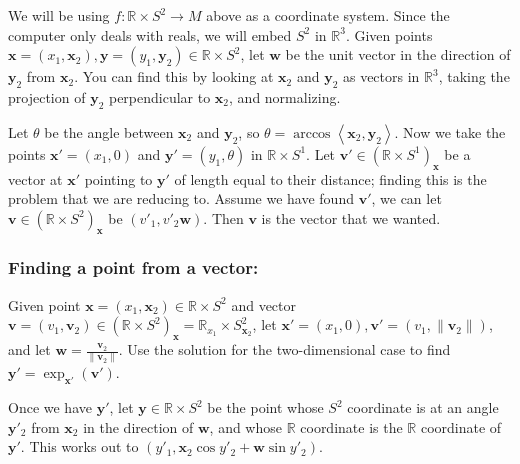\bigskip

We will be using $f:\mathbb{R} \times S^2 \to M$ above as a coordinate system. Since the computer only deals with reals, we will embed $S^2$ in $\mathbb{R}^3$. Given points $\textbf{x} = (x_1, \textbf{x}_2), \textbf{y} = (y_1, \textbf{y}_2) \in \mathbb{R} \times S^2$, let $\textbf{w}$ be the unit vector in the direction of $\textbf{y}_2$ from $\textbf{x}_2$. You can find this by looking at $\textbf{x}_2$ and $\textbf{y}_2$ as vectors in $\mathbb{R}^3$, taking the projection of $\textbf{y}_2$ perpendicular to $\textbf{x}_2$, and normalizing.

Let $\theta$ be the angle between $\textbf{x}_2$ and $\textbf{y}_2$, so $\theta = \arccos\left<\textbf{x}_2,\textbf{y}_2\right>$. Now we take the points $\textbf{x}' = (x_1, 0)$ and $\textbf{y}' = (y_1, \theta)$ in $\mathbb{R} \times S^1$. Let $\textbf{v}' \in (\mathbb{R} \times S^1)_\textbf{x}$ be a vector at $\textbf{x}'$ pointing to $\textbf{y}'$ of length equal to their distance; finding this is the problem that we are reducing to. Assume we have found $\textbf{v}'$, we can let $\textbf{v} \in (\mathbb{R} \times S^2)_\textbf{x}$ be $(v'_1, v'_2\textbf{w})$. Then $\textbf{v}$ is the vector that we wanted.



\bigskip

\subsubsection{Finding a point from a vector:}

\bigskip

Given point $\textbf{x} = (x_1, \textbf{x}_2) \in \mathbb{R} \times S^2$ and vector $\textbf{v} = (v_1, \textbf{v}_2) \in (\mathbb{R} \times S^2)_\textbf{x} = \mathbb{R}_{x_1} \times S^2_{\textbf{x}_2}$, let $\textbf{x}' = (x_1,0), \textbf{v}' = (v_1,\|\textbf{v}_2\|)$, and let $\textbf{w} = \frac{\textbf{v}_2}{\|\textbf{v}_2\|}$. Use the solution for the two-dimensional case to find $\textbf{y}' = \exp_{\textbf{x}'}(\textbf{v}')$.


Once we have $\textbf{y}'$, let $\textbf{y} \in \mathbb{R} \times S^2$ be the point whose $S^2$ coordinate is at an angle $\textbf{y}'_2$ from $\textbf{x}_2$ in the direction of $\textbf{w}$, and whose $\mathbb{R}$ coordinate is the $\mathbb{R}$ coordinate of $\textbf{y}'$. This works out to $(y'_1, \textbf{x}_2\cos y'_2+\textbf{w}\sin y'_2)$.

